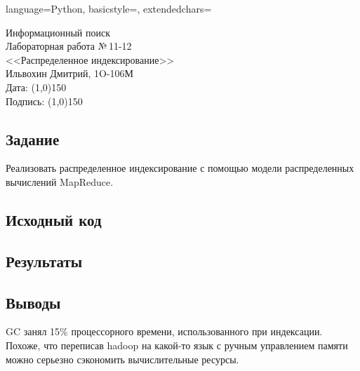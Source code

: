 \documentclass[12pt]{article}
\newcommand{\StudentName}{Ильвохин Дмитрий}
\newcommand{\Group}{1O-106М}
\newcommand{\CourseName}{Информационный поиск}
\newcommand{\LabNum}{11-12}
\newcommand{\Subject}{Распределенное индексирование}
\begin{document}
\lstset
{
        language=Python,
        basicstyle=\footnotesize,%
        extendedchars=\true
}

\begin{flushright}
\Large{
	\CourseName \\
	Лабораторная работа №\,\LabNum \\
	<<\Subject>> \\
  \StudentName, \Group \\
  Дата: \line(1,0){150} \\
  Подпись: \line(1,0){150} \\
}
\end{flushright}

\subsection*{Задание}
Реализовать распределенное индексирование с помощью модели
распределенных вычислений MapReduce.

\subsection*{Исходный код}


\subsection*{Результаты}


\subsection*{Выводы}
GC занял 15\% процессорного времени, использованного при индексации.
Похоже, что переписав hadoop на какой-то язык с ручным управлением памяти
можно серьезно сэкономить вычислительные ресурсы.
\end{document}
